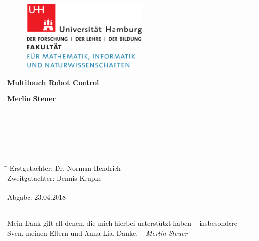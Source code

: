 \begin{titlepage}

  \setcounter{page}{-1}

	\begin{figure}[h]
		\begin{minipage}[b]{62mm}
			\includegraphics[width=62mm]{images/unilogo}
		\end{minipage}
		\hspace{4cm}
		\begin{minipage}[b]{59mm}
			\includegraphics[width=59mm]{images/minlogo}
		\end{minipage}
	\end{figure}

	\vfill
	
	\begin{center}
		\vspace{14mm}
		\noindent \textbf{\huge
		  Multitouch Robot Control \\
		}
		\vspace{60mm}	
	\end{center}
	
	\vfill
	
	\noindent \textbf{Merlin Steuer} \\
	\noindent \rule{\textwidth}{0.4mm} 
	 \\
	 \\
	 \\
	 \\
	\begin{tabbing}
	\hspace{8em} \=  \kill
	Erstgutachter: \> Dr. Norman Hendrich \\
	Zweitgutachter: \> Dennis Krupke \\
	~ \\
	Abgabe: 23.04.2018
	\end{tabbing}
	
	\newpage 
	\thispagestyle{empty}
	\setcounter{page}{0}

	~\\ \vfill \noindent 
	Mein Dank gilt all denen, die mich hierbei unterstützt haben -- insbesondere Sven, meinen Eltern und Anna-Lia. Danke.
	\textit{-- Merlin Steuer}
\end{titlepage}

